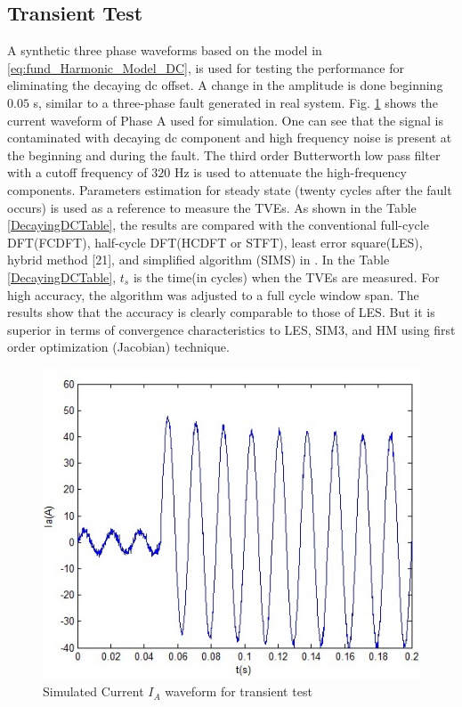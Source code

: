 \documentclass{UCF_ETD}
\begin{document}
\subsection{Transient Test}
A synthetic three phase waveforms based on the model in \eqref{eq:fund_Harmonic_Model_DC}, is used for testing the performance for eliminating the decaying dc offset. A change in the amplitude is done beginning $0.05$ s, similar to a three-phase fault generated in real system. Fig. \ref{TransientTest} shows the current waveform of Phase A used for simulation. One can see that the signal is contaminated with decaying dc component and high frequency noise is present at the beginning and during the fault. The third order Butterworth low pass filter with a cutoff frequency of $320$ Hz is used to attenuate the high-frequency components. Parameters estimation for steady state (twenty cycles after the fault occurs) is used as a reference to measure the TVEs. As shown in the Table \ref{DecayingDCTable}, the results are compared with the conventional full-cycle DFT(FCDFT), half-cycle DFT(HCDFT or STFT), least error square(LES), hybrid method [21], and simplified algorithm (SIMS) in \cite{Gou2003}. In the Table \ref{DecayingDCTable}, $t_s$ is the time(in cycles) when the TVEs are measured. For high accuracy, the algorithm was adjusted to a full cycle window span. The results show that the accuracy is clearly comparable to those of LES. But it is superior in terms of convergence characteristics to LES, SIM3, and HM using first order optimization (Jacobian) technique.

\begin{figure}[H]
\begin{center}
\includegraphics[scale=.8]{BLMS_Figures/TransientTest}
\caption{Simulated Current $I_A$ waveform for transient test}
\label{TransientTest}
\end{center}
\end{figure}
\end{document}
